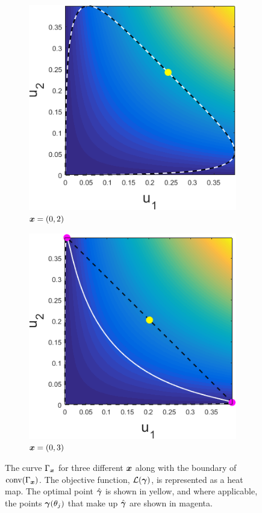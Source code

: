 \begin{figure}[ht]
\begin{subfigure}[t]{0.32\textwidth}
				\includegraphics[width = \textwidth]{Sigma1x1_0-x2_2}
				\caption{${\bm{{x}}} = (0,2)$} \label{subfig:gammaexampleb}
			\end{subfigure}
			\begin{subfigure}[t]{0.32\textwidth}
				\centering
				\includegraphics[width = \textwidth]{Sigma1x1_0-x2_3}
				\caption{${\bm{{x}}} = (0,3)$} \label{subfig:gammaexamplec}
			\end{subfigure}
			\caption{The curve $\Gamma_{\bm{{x}}}$ for three different ${\bm{{x}}}$ along with the boundary of $\mathrm{conv}(\Gamma_{\bm{{x}}})$. The objective function, $\mathcal{L}({\bm{{\gamma}}})$, is represented as a heat map. The optimal point $\hat{{\bm{{\gamma}}}}$ is shown in yellow, and where applicable, the points ${\bm{{\gamma}}}(\theta_j)$ that make up $\hat{{\bm{{\gamma}}}}$ are shown in magenta.}
			\label{fig:Gammaexample}
		\end{figure}

